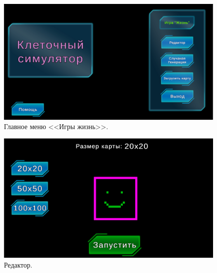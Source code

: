 \begin{code}
\vspace{-1cm}\inputminted[mathescape,linenos,frame=lines,fontsize=\tiny,breaklines]{csharp}{src/RandomButton.cs}
\end{code}

\begin{code}
\vspace{-1cm}\inputminted[mathescape,linenos,frame=lines,fontsize=\tiny,breaklines]{csharp}{src/LevelTransition.cs}
\end{code}

\begin{figure}[H]
	\centering
	\includegraphics[width=1\textwidth]{images/MainMenu.png}  
	\caption{Главное меню <<Игры жизнь>>.}
	\label{MainM}
\end{figure}

\begin{figure}[H]
	\centering
	\includegraphics[width=1\textwidth]{images/Editor.png}  
	\caption{Редактор.}
	\label{Editor}
\end{figure}


